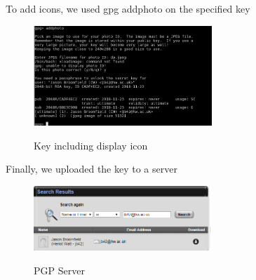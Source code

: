 \noindent To add icons, we used gpg addphoto on the specified key
\begin{figure}[hbt!]
	\centering
      \includegraphics[width=0.6\textwidth]{imgs/pgp/icon} \\
	\caption{Key including display icon}
	\label{fig:specifiyingkeysize}
    \noindent\makebox[\linewidth]{}
\end{figure}

\noindent Finally, we uploaded the key to a server
\begin{figure}[hbt!]
	\centering
      \includegraphics[width=0.6\textwidth]{imgs/pgp/Capture} \\
	\caption{PGP Server}
	\label{fig:specifiyingkeysize}
    \noindent\makebox[\linewidth]{}
\end{figure}


